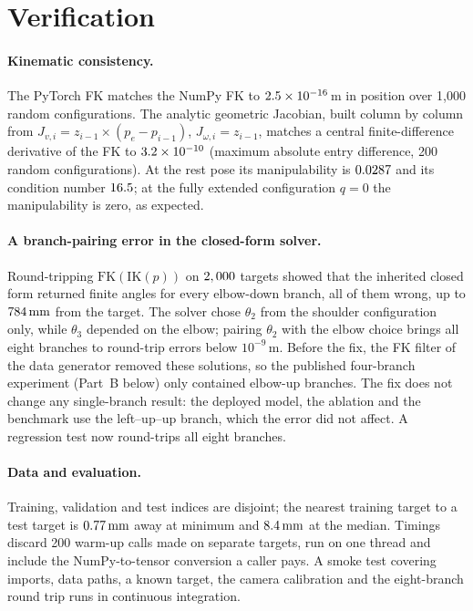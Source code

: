 \documentclass[11pt]{article}
\newcommand{\mm}{\,\mathrm{mm}}
\begin{document}
\section{Verification}
\label{sec:verif}
\paragraph{Kinematic consistency.}
The PyTorch FK matches the NumPy FK to $2.5\times 10^{-16}$\,m in position over 1,000
random configurations. The analytic geometric Jacobian, built column by column
from $J_{v,i}=z_{i-1}\times(p_e-p_{i-1})$, $J_{\omega,i}=z_{i-1}$, matches a
central finite-difference derivative of the FK to $3.2\times 10^{-10}$ (maximum absolute
entry difference, 200 random configurations). At the rest pose its
manipulability is $0.0287$ and its condition number $16.5$; at
the fully extended configuration $q=0$ the manipulability is zero, as expected.

\paragraph{A branch-pairing error in the closed-form solver.}
Round-tripping $\mathrm{FK}(\mathrm{IK}(p))$ on $2,000$ targets showed that
the inherited closed form returned finite angles for every elbow-down branch,
all of them wrong, up to $\bugWorst\mm$ from the target. The solver chose
$\theta_2$ from the shoulder configuration only, while $\theta_3$ depended on
the elbow; pairing $\theta_2$ with the elbow choice brings all eight branches
to round-trip errors below $10^{-9}$\,m. Before the fix, the FK filter of the
data generator removed these solutions, so the published four-branch
experiment (Part~B below) only contained elbow-up branches. The fix does not
change any single-branch result: the deployed model, the ablation and the
benchmark use the left--up--up branch, which the error did not affect. A
regression test now round-trips all eight branches.

\paragraph{Data and evaluation.}
Training, validation and test indices are disjoint; the nearest training
target to a test target is $\nnMin\mm$ away at minimum and $\nnMedian\mm$ at
the median. Timings discard 200 warm-up calls made on separate targets, run on one thread and include the
NumPy-to-tensor conversion a caller pays. A smoke test covering imports, data
paths, a known target, the camera calibration and the eight-branch round trip
runs in continuous integration.
\end{document}
